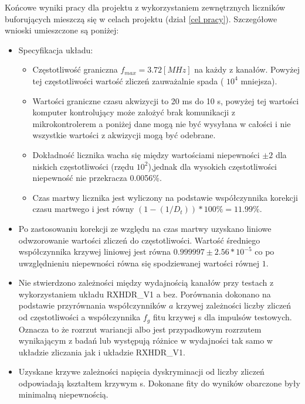 Końcowe wyniki pracy dla projektu z wykorzystaniem zewnętrznych liczników buforujących mieszczą się w celach projektu (dział \ref{cel pracy}). Szczegółowe wnioski umieszczone są poniżej:
\begin{itemize}
        \item Specyfikacja układu:
        \begin{itemize}
                \item Częstotliwość graniczna $f_{max} = 3.72 [MHz]$ na każdy z kanałów. Powyżej tej częstotliwości wartość zliczeń zauważalnie spada ( $10^4$ mniejsza).
                \item Wartości graniczne czasu akwizycji to 20 ms do 10 s, powyżej tej wartości komputer kontrolujący może założyć brak komunikacji z mikrokontrolerem a poniżej dane mogą nie być wysyłana w całości i nie wszystkie wartości z akwizycji mogą być odebrane. 
                \item Dokładność licznika wacha się między wartościami niepewności $\pm 2$ dla niskich częstotliwości (rzędu $10^{2}$),jednak dla wysokich częstotliwości niepewność nie przekracza 0.0056\%.
                \item Czas martwy licznika jest wyliczony na podstawie współczynnika korekcji czasu martwego i jest równy $(1-(1/D_t))* 100\% = 11.99 \%$.
        \end{itemize}
        \item Po zastosowaniu korekcji ze względu na czas martwy uzyskano liniowe odwzorowanie wartości zliczeń do częstotliwości. Wartość średniego współczynnika krzywej liniowej jest równa $ 0.999997 \pm 2.56 * 10^{-5}$ co po uwzględnieniu niepewności równa się spodziewanej wartości równej $1$.
        \item Nie stwierdzono zależności między wydajnością kanałów przy testach z wykorzystaniem układu RXHDR\_V1 a bez. Porównania dokonano na podstawie przyrównania współczynników $a$ krzywej zależności liczby zliczeń od częstotliwości a współczynnika $f_g$ fitu krzywej s dla impulsów testowych. Oznacza to że rozrzut wariancji albo jest przypadkowym rozrzutem wynikającym z badań lub występują różnice w wydajności tak samo w układzie zliczania jak i układzie RXHDR\_V1.
        \item Uzyskane krzywe zależności napięcia dyskryminacji od liczby zliczeń odpowiadają kształtem krzywym s. Dokonane fity do wyników obarczone były minimalną niepewnością.     
\end{itemize}


